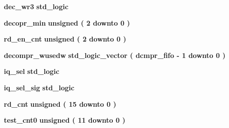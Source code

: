 \begin{DoxyCompactItemize}
\item 
{\bf dec\+\_\+wr3} {\bfseries \textcolor{comment}{std\+\_\+logic}\textcolor{vhdlchar}{ }} 
\item 
{\bf decopr\+\_\+min} {\bfseries \textcolor{comment}{unsigned}\textcolor{vhdlchar}{ }\textcolor{vhdlchar}{(}\textcolor{vhdlchar}{ }\textcolor{vhdlchar}{ } \textcolor{vhdldigit}{2} \textcolor{vhdlchar}{ }\textcolor{keywordflow}{downto}\textcolor{vhdlchar}{ }\textcolor{vhdlchar}{ } \textcolor{vhdldigit}{0} \textcolor{vhdlchar}{ }\textcolor{vhdlchar}{)}\textcolor{vhdlchar}{ }} 
\item 
{\bf rd\+\_\+en\+\_\+cnt} {\bfseries \textcolor{comment}{unsigned}\textcolor{vhdlchar}{ }\textcolor{vhdlchar}{(}\textcolor{vhdlchar}{ }\textcolor{vhdlchar}{ } \textcolor{vhdldigit}{2} \textcolor{vhdlchar}{ }\textcolor{keywordflow}{downto}\textcolor{vhdlchar}{ }\textcolor{vhdlchar}{ } \textcolor{vhdldigit}{0} \textcolor{vhdlchar}{ }\textcolor{vhdlchar}{)}\textcolor{vhdlchar}{ }} 
\item 
{\bf decompr\+\_\+wusedw} {\bfseries \textcolor{comment}{std\+\_\+logic\+\_\+vector}\textcolor{vhdlchar}{ }\textcolor{vhdlchar}{(}\textcolor{vhdlchar}{ }\textcolor{vhdlchar}{ }\textcolor{vhdlchar}{ }\textcolor{vhdlchar}{ }{\bfseries {\bf dcmpr\+\_\+fifo}} \textcolor{vhdlchar}{-\/}\textcolor{vhdlchar}{ } \textcolor{vhdldigit}{1} \textcolor{vhdlchar}{ }\textcolor{keywordflow}{downto}\textcolor{vhdlchar}{ }\textcolor{vhdlchar}{ } \textcolor{vhdldigit}{0} \textcolor{vhdlchar}{ }\textcolor{vhdlchar}{)}\textcolor{vhdlchar}{ }} 
\item 
{\bf iq\+\_\+sel} {\bfseries \textcolor{comment}{std\+\_\+logic}\textcolor{vhdlchar}{ }} 
\item 
{\bf iq\+\_\+sel\+\_\+sig} {\bfseries \textcolor{comment}{std\+\_\+logic}\textcolor{vhdlchar}{ }} 
\item 
{\bf rd\+\_\+cnt} {\bfseries \textcolor{comment}{unsigned}\textcolor{vhdlchar}{ }\textcolor{vhdlchar}{(}\textcolor{vhdlchar}{ }\textcolor{vhdlchar}{ } \textcolor{vhdldigit}{15} \textcolor{vhdlchar}{ }\textcolor{keywordflow}{downto}\textcolor{vhdlchar}{ }\textcolor{vhdlchar}{ } \textcolor{vhdldigit}{0} \textcolor{vhdlchar}{ }\textcolor{vhdlchar}{)}\textcolor{vhdlchar}{ }} 
\item 
{\bf test\+\_\+cnt0} {\bfseries \textcolor{comment}{unsigned}\textcolor{vhdlchar}{ }\textcolor{vhdlchar}{(}\textcolor{vhdlchar}{ }\textcolor{vhdlchar}{ } \textcolor{vhdldigit}{11} \textcolor{vhdlchar}{ }\textcolor{keywordflow}{downto}\textcolor{vhdlchar}{ }\textcolor{vhdlchar}{ } \textcolor{vhdldigit}{0} \textcolor{vhdlchar}{ }\textcolor{vhdlchar}{)}\textcolor{vhdlchar}{ }} 

\end{DoxyCompactItemize}
